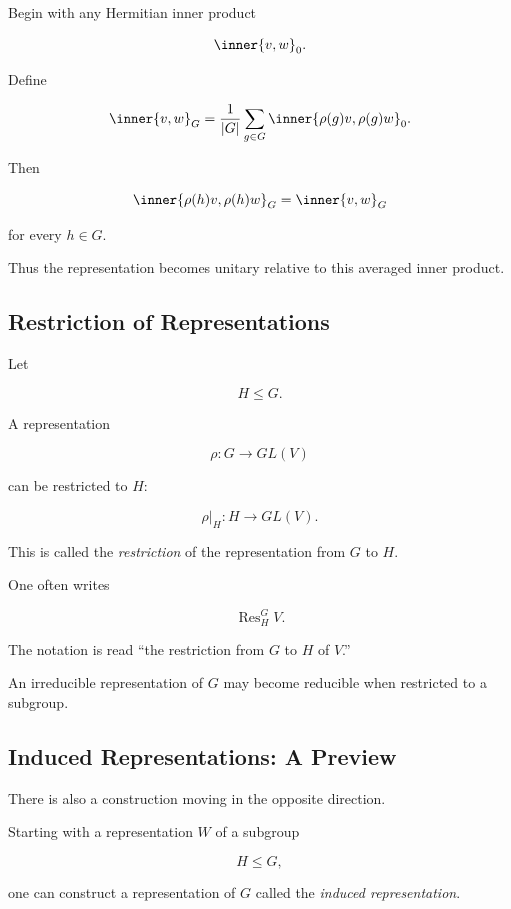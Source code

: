 Begin with any Hermitian inner product

\[ \inner{v,w}_0. \]

Define

\[ \inner{v,w}_G
=\frac{1}{|G|}\sum_{g\in G}
\inner{\rho(g)v,\rho(g)w}_0. \]

Then

\[ \inner{\rho(h)v,\rho(h)w}_G=\inner{v,w}_G \]

for every \(h\in G\).

Thus the representation becomes unitary relative to this averaged inner
product.

\subsection{Restriction of Representations}
\label{subsec:restriction-representations}

Let

\[ H\leq G. \]

A representation

\[ \rho:G\to GL(V) \]

can be restricted to \(H\):

\[ \rho|_H:H\to GL(V). \]

This is called the \emph{restriction} of the representation from \(G\) to
\(H\).

One often writes

\[ \operatorname{Res}^G_H V. \]

The notation is read ``the restriction from \(G\) to \(H\) of \(V\).''

An irreducible representation of \(G\) may become reducible when restricted
to a subgroup.

\subsection{Induced Representations: A Preview}
\label{subsec:induced-representations}

There is also a construction moving in the opposite direction.

Starting with a representation \(W\) of a subgroup

\[ H\leq G, \]

one can construct a representation of \(G\) called the \emph{induced
representation}.

